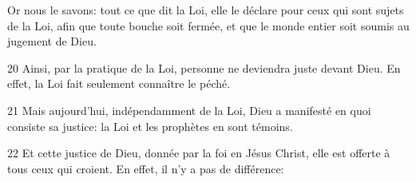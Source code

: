 Or nous le savons: tout ce que dit la Loi, elle le déclare pour ceux qui sont sujets de la Loi, afin que toute bouche soit fermée, et que le monde entier soit soumis au jugement de Dieu.

20 Ainsi, par la pratique de la Loi, personne ne deviendra juste devant Dieu. En effet, la Loi fait seulement connaître le péché.

21 Mais aujourd’hui, indépendamment de la Loi, Dieu a manifesté en quoi consiste sa justice: la Loi et les prophètes en sont témoins.

22 Et cette justice de Dieu, donnée par la foi en Jésus Christ, elle est offerte à tous ceux qui croient. En effet, il n’y a pas de différence:
